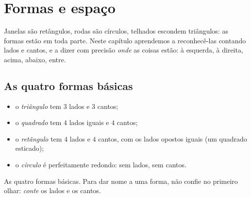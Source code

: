 \chapter{Formas e espaço}\label{ch:g1:shapes}

Janelas são retângulos, rodas são círculos, telhados escondem
triângulos: as formas estão em toda parte. Neste capítulo aprendemos
a reconhecê-las contando lados e cantos, e a dizer com precisão
\emph{onde} as coisas estão: à esquerda, à direita, acima, abaixo,
entre.

\section{As quatro formas básicas}

\begin{definition}\label{def:g1:shapes:def}
\begin{itemize}
  \item o \emph{triângulo} tem $3$ lados e $3$ cantos;
  \item o \emph{quadrado} tem $4$ lados iguais e $4$ cantos;
  \item o \emph{retângulo} tem $4$ lados e $4$ cantos, com os
        lados opostos iguais (um quadrado esticado);
  \item o \emph{círculo} é perfeitamente redondo: sem lados, sem cantos.
\end{itemize}
\end{definition}

\begin{omfigure}

{\small As quatro formas básicas. Para dar nome a uma forma, não
confie no primeiro olhar: \emph{conte} os lados e os cantos.}
\end{omfigure}

